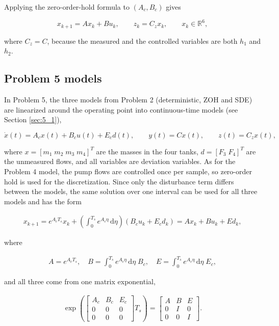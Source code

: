 Applying the zero-order-hold formula to $(A_c,B_c)$ gives

\begin{equation}
  x_{k+1}=Ax_k+Bu_k,\qquad z_k=C_zx_k,\qquad x_k\in\mathbb{R}^6,
\end{equation}

where $C_z=C$, because the measured and the controlled variables are both $h_1$ and $h_2$.


\subsection{Problem 5 models}
\label{sec:ss61-p5}

In Problem 5, the three models from Problem 2 (deterministic, ZOH and SDE) are linearized around the operating point into continuous-time models (see Section \ref{sec:5_1}),

\begin{equation}
  \dot x(t) = A_cx(t) + B_cu(t) + E_cd(t), \qquad
  y(t) = Cx(t), \qquad z(t) = C_zx(t),
\end{equation}

where $x=[m_1\;m_2\;m_3\;m_4]^T$ are the masses in the four tanks, $d=[F_3\;F_4]^T$ are the unmeasured flows, and all variables are deviation variables. As for the Problem 4 model, the pump flows are controlled once per sample, so zero-order hold is used for the discretization. Since only the disturbance term differs between the models, the same solution over one interval can be used for all three models and has the form

\begin{align}
  x_{k+1} = e^{A_cT_s}x_k + \left(\int_0^{T_s} e^{A_c\eta}\,\mathrm{d}\eta\right)\left(B_cu_k + E_cd_k\right) = Ax_k + Bu_k + Ed_k,
\end{align}

where

\begin{align}
  A = e^{A_cT_s}, \quad
  B = \int_0^{T_s} e^{A_c\eta}\,\mathrm{d}\eta\;B_c, \quad
  E = \int_0^{T_s} e^{A_c\eta}\,\mathrm{d}\eta\;E_c,
\end{align}

and all three come from one matrix exponential,

\begin{align}
  \exp\!\left(\begin{bmatrix}
    A_c & B_c & E_c \\
    0 & 0 & 0 \\
    0 & 0 & 0
  \end{bmatrix} T_s\right) = \begin{bmatrix}
    A & B & E \\
    0 & I & 0 \\
    0 & 0 & I
  \end{bmatrix}.
\end{align}

